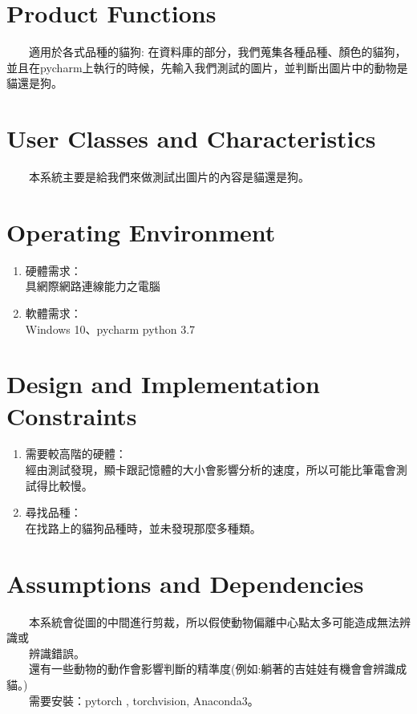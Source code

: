 \documentclass{scrreprt}
\begin{document}
\begin{CJK*}{UTF8}{bsmi}
\section{Product Functions}
　　適用於各式品種的貓狗: 在資料庫的部分，我們蒐集各種品種、顏色的貓狗，並且在pycharm上執行的時候，先輸入我們測試的圖片，並判斷出圖片中的動物是貓還是狗。

\section{User Classes and Characteristics}
　　本系統主要是給我們來做測試出圖片的內容是貓還是狗。

\section{Operating Environment}
\begin{enumerate}
	\item 硬體需求：\\具網際網路連線能力之電腦
	\item 軟體需求：\\Windows 10、pycharm python 3.7
\end{enumerate}

\section{Design and Implementation Constraints}
\begin{enumerate}
	\item 需要較高階的硬體：\\經由測試發現，顯卡跟記憶體的大小會影響分析的速度，所以可能比筆電會測試得比較慢。
	\item 尋找品種：\\在找路上的貓狗品種時，並未發現那麼多種類。
\end{enumerate}

\section{Assumptions and Dependencies}
　　本系統會從圖的中間進行剪裁，所以假使動物偏離中心點太多可能造成無法辨識或\\
　　辨識錯誤。\\
　　還有一些動物的動作會影響判斷的精準度(例如:躺著的吉娃娃有機會會辨識成貓。)\\
　　需要安裝：pytorch , torchvision, Anaconda3。\\





\end{CJK*}
\end{document}
